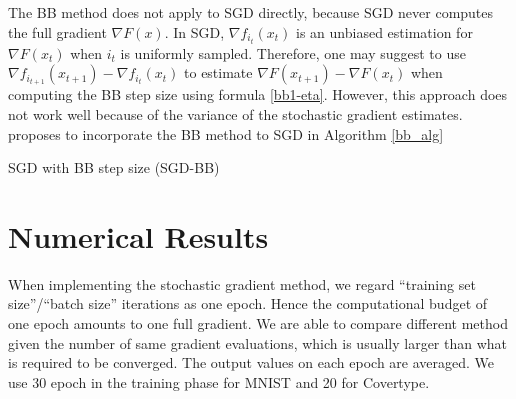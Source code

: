 \documentclass[conference,onecolumn,12pt]{IEEEtran}
\renewcommand{\(}{\left(}
\renewcommand{\)}{\right)}
\numberwithin{equation}{section}
\numberwithin{figure}{section}
\numberwithin{table}{section}
\theoremstyle{definition}
\begin{document}
The BB method does not apply to SGD directly, because SGD never computes the full gradient $\nabla F(x)$. In SGD, $\nabla f_{i_t}(x_t)$ is an unbiased estimation for $\nabla F(x_t)$ when $i_t$ is uniformly sampled. Therefore, one may suggest to use $\nabla f_{i_{t+1}}(x_{t+1})-\nabla f_{i_t}(x_t)$ to estimate $\nabla F(x_{t+1})-\nabla F(x_t)$ when computing the BB step size using formula \eqref{bb1-eta}. However, this approach does not work well because of the variance of the stochastic gradient estimates. \cite{tan2016barzilai} proposes to incorporate the BB method to SGD in Algorithm \ref{bb_alg}
\IncMargin{1em} %




\begin{algorithm}
  \label{bb_alg}
  \caption{SGD with BB step size (SGD-BB)}
    \SetAlgoNoLine %
    \BlankLine
      \end{algorithm}
\DecMargin{1em}


\section{Numerical Results}
When implementing the stochastic gradient method, we regard ``training set size''/``batch size'' iterations as one epoch. Hence the computational budget of one epoch amounts to one full gradient. We are able to compare different method given the number of same gradient evaluations, which is usually larger than what is required to be converged. The output values on each epoch are averaged. We use 30 epoch in the training phase for MNIST and 20 for Covertype.
\end{document}
